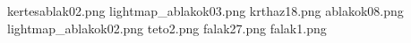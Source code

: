 kertesablak02.png
lightmap_ablakok03.png
krthaz18.png
ablakok08.png
lightmap_ablakok02.png
teto2.png
falak27.png
falak1.png
